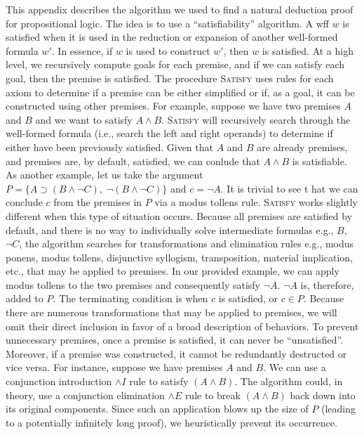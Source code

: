 \documentclass[ms]{uncgdissertationexp2}
\theoremstyle{plain}
\theoremstyle{definition}
\theoremstyle{remark}
\begin{document}
This appendix describes the algorithm we used to find a natural deduction proof for propositional logic. The idea is to use a ``satisfiability'' algorithm. A wff $w$ is satisfied when it is used in the reduction or expansion of another well-formed formula $w'$. In essence, if $w$ is used to construct $w'$, then $w$ is satisfied. At a high level, we recursively compute goals for each premise, and if we can satisfy each goal, then the premise is satisfied. The procedure \textsc{Satisfy} uses rules for each axiom to determine if a premise can be either simplified or if, as a goal, it can be constructed using other premises. For example, suppose we have two premises $A$ and $B$ and we want to satisfy $A \land B$. \textsc{Satisfy} will recursively search through the well-formed formula (i.e., search the left and right operands) to determine if either have been previously satisfied. Given that $A$ and $B$ are already premises, and premises are, by default, satisfied, we can conlude that $A \land B$ is satisfiable. As another example, let us take the argument $P = \{A \supset (B \land \lnot C),\;\lnot (B \land \lnot C)\}$ and $c = \lnot A$. It is trivial to see t hat we can conclude $c$ from the premises in $P$ via a modus tollens rule. \textsc{Satisfy} works slightly different when this type of situation occurs. Because all premises are satisfied by default, and there is no way to individually solve intermediate formulas e.g., $B$, $\lnot C$, the algorithm searches for transformations and elimination rules e.g., modus ponens, modus tollens, disjunctive syllogism, transposition, material implication, etc., that may be applied to premises. In our provided example, we can apply modus tollens to the two premises and consequently satisfy $\lnot{A}$. $\lnot{A}$ is, therefore, added to $P$. The terminating condition is when $c$ is satisfied, or $c \in P$. Because there are numerous transformations that may be applied to premises, we will omit their direct inclusion in favor of a broad description of behaviors. To prevent unnecessary premises, once a premise is satisfied, it can never be ``unsatisfied''. Moreover, if a premise was constructed, it cannot be redundantly destructed or vice versa. For instance, suppose we have premises $A$ and $B$. We can use a conjunction introduction $\land{I}$ rule to satisfy $(A \land B)$. The algorithm could, in theory, use a conjunction elimination $\land{E}$ rule to break $(A \land B)$ back down into its original components. Since such an application blows up the size of $P$ (leading to a potentially infinitely long proof), we heuristically prevent its occurrence.
\end{document}
